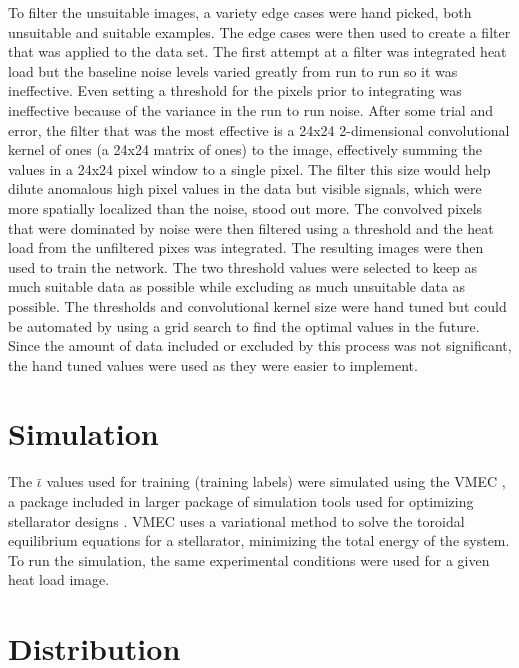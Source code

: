 To filter the unsuitable images, a variety edge cases were hand picked, both unsuitable and suitable examples. The edge cases were then used to create a filter that was applied to the data set. The first attempt at a filter was integrated heat load but the baseline noise levels varied greatly from run to run so it was ineffective. Even setting a threshold for the pixels prior to integrating was ineffective because of the variance in the run to run noise. After some trial and error, the filter that was the most effective is a 24x24 2-dimensional convolutional kernel of ones (a 24x24 matrix of ones) to the image, effectively summing the values in a 24x24 pixel window to a single pixel. The filter this size would help dilute anomalous high pixel values in the data but visible signals, which were more spatially localized than the noise, stood out more. The convolved pixels that were dominated by noise were then filtered using a threshold and the heat load from the unfiltered pixes was integrated. The resulting images were then used to train the network. The two threshold values were selected to keep as much suitable data as possible while excluding as much unsuitable data as possible. The thresholds and convolutional kernel size were hand tuned but could be automated by using a grid search to find the optimal values in the future. Since the amount of data included or excluded by this process was not significant, the hand tuned values were used as they were easier to implement.




\label{sec:Data Simulation}
\section{Simulation}

The $\bar{\iota}$ values used for training (training labels) were simulated using the VMEC \cite{VMEC}, a package included in larger package of simulation tools used for optimizing stellarator designs \cite{STELLOPT}. VMEC uses a variational method to solve the toroidal equilibrium equations for a stellarator, minimizing the total energy of the system\cite{VMEC}. To run the simulation, the same experimental conditions were used for a given heat load image.

\label{sec:Data Distribution}
\section{Distribution}

